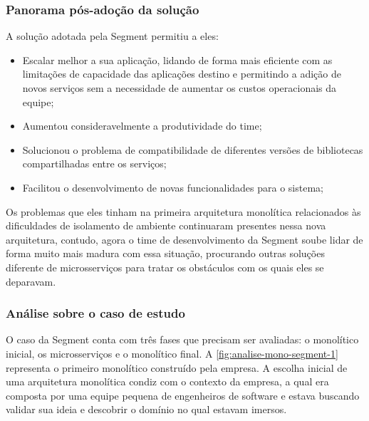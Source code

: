 \subsubsection{Panorama pós-adoção da solução}

A solução adotada pela Segment permitiu a eles:

\begin{itemize}
    \item Escalar melhor a sua aplicação, lidando de forma mais eficiente com as limitações de
        capacidade das aplicações destino e permitindo a adição de novos serviços sem a necessidade
        de aumentar os custos operacionais da equipe;
    \item Aumentou consideravelmente a produtividade do time;
    \item Solucionou o problema de compatibilidade de diferentes versões de bibliotecas
        compartilhadas entre os serviços;
    \item Facilitou o desenvolvimento de novas funcionalidades para o sistema;
\end{itemize}

Os problemas que eles tinham na primeira arquitetura monolítica relacionados às dificuldades de
isolamento de ambiente continuaram presentes nessa nova arquitetura, contudo, agora o time de
desenvolvimento da Segment soube lidar de forma muito mais madura com essa situação, procurando
outras soluções diferente de microsserviços para tratar os obstáculos com os quais eles se
deparavam.

\subsubsection{Análise sobre o caso de estudo}

O caso da Segment conta com três fases que precisam ser avaliadas: o monolítico inicial, os
microsserviços e o monolítico final. A \autoref{fig:analise-mono-segment-1} representa o
primeiro monolítico construído pela empresa. A escolha inicial de uma arquitetura monolítica condiz
com o contexto da empresa, a qual era composta por uma equipe pequena de engenheiros de software e
estava buscando validar sua ideia e descobrir o domínio no qual estavam imersos. 

